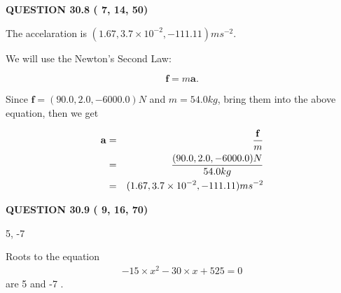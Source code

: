 \documentclass[12pt]{article}
\begin{document}
 
 
 
 
\noindent{}

 
 
  
\vspace{0.2in}
  
{\textbf{\Large{QUESTION
30.8 
 (          7,         14,         50)
}}}
  
  
 
 
\noindent{}
 
 
  The accelaration is $  %
(
1.67,
3.7 \times 10^{-2},
-111.11)
ms^{-2} $.
 
 
 
 
 
 
\noindent{}

We will use the Newton's Second Law:
 
\[
\mathbf{f}=m\mathbf{a}.
\]
 
Since $\mathbf{f}= %
(90.0 , 2.0 , -6000.0) N$
and $m= %
54.0kg$, bring them into the above equation, then we get
 
\begin{eqnarray*}
\mathbf{a}&=&\frac{\mathbf{f}}m  \\
&=&\frac{ %
(90.0 , 2.0 , -6000.0) N}{ %
54.0kg}  \\
&=& %
(1.67 , 3.7 \times 10^{-2} , -111.11) ms^{-2}
\end{eqnarray*}
 
 
 
  
\vspace{0.2in}
  
{\textbf{\Large{QUESTION
30.9 
 (          9,         16,         70)
}}}
  
  


 
 
\noindent{}

5,  %
-7
 
 
 
 
 
\noindent{}

Roots to the equation
\begin{eqnarray*}
-15 \times x^2  %
-30
                 \times x    %
+  %
525 =0
\end{eqnarray*}
are  %
5 and  %
-7 .
 
\end{document}
